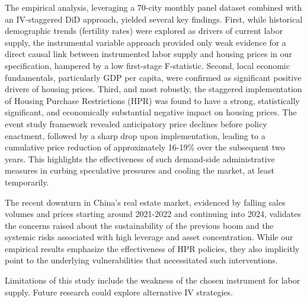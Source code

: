 \documentclass[12pt,english]{article}
\begin{document}
	The empirical analysis, leveraging a 70-city monthly panel dataset combined with an IV-staggered DiD approach, yielded several key findings. First, while historical demographic trends (fertility rates) were explored as drivers of current labor supply, the instrumental variable approach provided only weak evidence for a direct causal link between instrumented labor supply and housing prices in our specification, hampered by a low first-stage F-statistic. Second, local economic fundamentals, particularly GDP per capita, were confirmed as significant positive drivers of housing prices. Third, and most robustly, the staggered implementation of Housing Purchase Restrictions (HPR) was found to have a strong, statistically significant, and economically substantial negative impact on housing prices. The event study framework revealed anticipatory price declines before policy enactment, followed by a sharp drop upon implementation, leading to a cumulative price reduction of approximately 16-19\% over the subsequent two years. This highlights the effectiveness of such demand-side administrative measures in curbing speculative pressures and cooling the market, at least temporarily.
	
	The recent downturn in China's real estate market, evidenced by falling sales volumes and prices starting around 2021-2022 and continuing into 2024, validates the concerns raised about the sustainability of the previous boom and the systemic risks associated with high leverage and asset concentration. While our empirical results emphasize the effectiveness of HPR policies, they also implicitly point to the underlying vulnerabilities that necessitated such interventions.
	
	Limitations of this study include the weakness of the chosen instrument for labor supply. Future research could explore alternative IV strategies.
	
	\vfill
	\pagebreak{}
	\begin{spacing}{1.0}
		
		
	\end{spacing}
	
	
	
	
\end{document}
